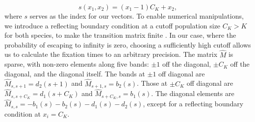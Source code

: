 \documentclass[a4paper,10pt]{article}
\numberwithin{equation}{section} %
\begin{document}
\begin{equation}
s(x_1,x_2) = (x_1-1)C_K+x_2,
\end{equation}
where $s$ serves as the index for our vectors. %
To enable numerical manipulations, we introduce a reflecting boundary condition at a cutoff population size $C_K>K$ for both species, to make the transition matrix finite \cite{Cao2016,Munsky2006}. 
In our case, where the probability of escaping to infinity is zero, choosing a sufficiently high cutoff allows us to calculate the fixation times to an arbitrary precision. 
The matrix $\hat{M}$ is sparse, with non-zero elements along five bands: $\pm 1$ off the diagonal, $\pm C_K$ off the diagonal, and the diagonal itself. 
The bands at $\pm 1$ off diagonal are $\hat{M}_{s,s+1}=d_2(s+1)$ and $\hat{M}_{s+1,s}=b_2(s)$. 
Those at $\pm C_K$ off diagonal are $\hat{M}_{s,s+C_K}=d_1(s+C_K)$ and $\hat{M}_{s+C_K,s}=b_1(s)$. 
The diagonal elements are $\hat{M}_{s,s}=-b_1(s)-b_2(s)-d_1(s)-d_2(s)$, except for a reflecting boundary condition at $x_i=C_K$. 
\end{document}
